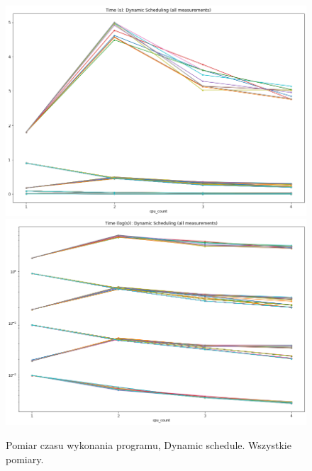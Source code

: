 \documentclass{article}
\begin{document}
        \begin{figure}[h!]
            \centering
            \includegraphics[width=17cm]{report2/images/Type/ex3_dynamic_all.png}
            \includegraphics[width=17cm]{report2/images/Type/ex3_dynamic_all_log.png}
            \caption{Pomiar czasu wykonania programu, Dynamic schedule. Wszystkie pomiary. }
        \end{figure}
        \newpage
\end{document}
